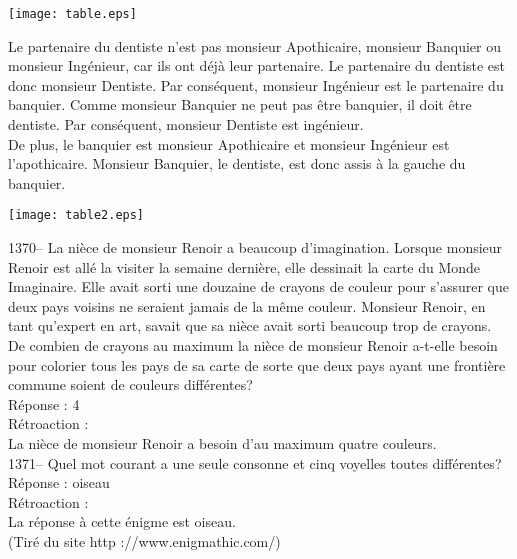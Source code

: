 ﻿\documentclass[letterpaper, 12pt]{article}
\begin{document}
    \begin{flushleft}
    \texttt{[image: table.eps]}
    \end{flushleft}

Le partenaire du dentiste n'est pas monsieur Apothicaire, monsieur Banquier
ou monsieur Ing\'enieur, car ils ont d\'ej\`a leur partenaire.  Le
partenaire du dentiste est donc monsieur Dentiste.  Par cons\'equent,
monsieur Ing\'enieur est le partenaire du banquier.  Comme monsieur Banquier
ne peut pas \^etre banquier, il doit \^etre dentiste.  Par cons\'equent,
monsieur Dentiste est ing\'enieur.  \\
De plus, le banquier est monsieur Apothicaire et monsieur Ing\'enieur est
l'apothicaire.  Monsieur Banquier, le dentiste, est donc assis \`a la gauche
du banquier.\\

    \begin{center}
    \texttt{[image: table2.eps]}
    \end{center}

1370-- La ni\`ece de monsieur Renoir a beaucoup d'imagination.
Lorsque monsieur Renoir est all\'e la visiter la semaine derni\`ere,
elle dessinait la carte du \og Monde Imaginaire\fg .  Elle avait
sorti une douzaine de crayons de couleur pour s'assurer que deux
pays voisins ne seraient jamais de la m\^eme couleur.  Monsieur
Renoir, en tant qu'expert en art, savait que sa ni\`ece avait sorti
beaucoup trop de crayons.  De combien de crayons au maximum la
ni\`ece de monsieur Renoir a-t-elle besoin pour colorier tous les
pays de sa carte de sorte que deux pays ayant une fronti\`ere
commune soient de
couleurs diff\'erentes?\\

R\'eponse : 4\\

R\'etroaction : \\
La ni\`ece de monsieur Renoir a besoin d'au maximum quatre couleurs.\\

1371-- Quel mot courant a une seule consonne et cinq voyelles toutes
diff\'erentes?\\

R\'eponse : oiseau\\

R\'etroaction : \\
La r\'eponse \`a cette \'enigme est oiseau.\\
(Tir\'e du site http ://www.enigmathic.com/)\\
\end{document}
